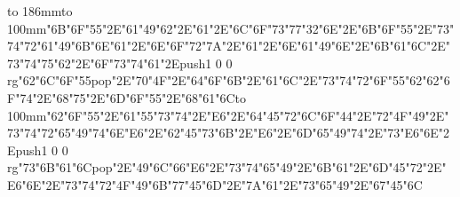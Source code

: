 \hbox to 186mm{\hsize=81mm\vbox to 100mm{\vfill\ipa\char"6B\ipa\char"6F\ipa\char"55\ipa\char"2E\ipa\char"61\ipa\char"49\ipa\char"62\ipa\char"2E\ipa\char"61\ipa\char"2E\ipa\char"6C\ipa\char"6F\ipa\char"73\medskip\ipa\char"77\ipa\char"32\ipa\char"6E\ipa\char"2E\ipa\char"6B\ipa\char"6F\ipa\char"55\ipa\char"2E\ipa\char"73\ipa\char"74\ipa\char"72\ipa\char"61\ipa\char"49\ipa\char"6B\medskip\ipa\char"6E\ipa\char"61\ipa\char"2E\ipa\char"6E\ipa\char"6F\ipa\char"72\ipa\char"7A\ipa\char"2E\ipa\char"61\ipa\char"2E\ipa\char"6E\ipa\char"61\ipa\char"49\ipa\char"6E\ipa\char"2E\ipa\char"6B\ipa\char"61\ipa\char"6C\ipa\char"2E\ipa\char"73\ipa\char"74\ipa\char"75\ipa\char"62\ipa\char"2E\ipa\char"6F\ipa\char"73\ipa\char"74\medskip\ipa\char"61\ipa\char"2E\pdfcolorstack\match push{1 0 0 rg}\ipa\char"62\ipa\char"6C\ipa\char"6F\ipa\char"55\pdfcolorstack\match pop{}\ipa\char"2E\ipa\char"70\ipa\char"4F\ipa\char"2E\ipa\char"64\ipa\char"6F\ipa\char"6B\ipa\char"2E\ipa\char"61\ipa\char"6C\ipa\char"2E\ipa\char"73\ipa\char"74\ipa\char"72\ipa\char"6F\ipa\char"55\ipa\char"62\medskip\ipa\char"62\ipa\char"6F\ipa\char"74\ipa\char"2E\ipa\char"68\ipa\char"75\ipa\char"2E\ipa\char"6D\ipa\char"6F\ipa\char"55\ipa\char"2E\ipa\char"68\ipa\char"61\ipa\char"6C\vfill}\hfill\vbox to 100mm{\vfill\ipa\char"62\ipa\char"6F\ipa\char"55\ipa\char"2E\ipa\char"61\ipa\char"55\ipa\char"73\ipa\char"74\ipa\char"2E\ipa\char"E6\ipa\char"2E\ipa\char"64\ipa\char"45\ipa\char"72\medskip\ipa\char"6C\ipa\char"6F\ipa\char"44\ipa\char"2E\ipa\char"72\ipa\char"4F\ipa\char"49\ipa\char"2E\ipa\char"73\ipa\char"74\ipa\char"72\ipa\char"65\ipa\char"49\ipa\char"74\medskip\ipa\char"6E\ipa\char"E6\ipa\char"2E\ipa\char"62\ipa\char"45\ipa\char"73\ipa\char"6B\ipa\char"2E\ipa\char"E6\ipa\char"2E\ipa\char"6D\ipa\char"65\ipa\char"49\ipa\char"74\ipa\char"2E\ipa\char"73\ipa\char"E6\ipa\char"6E\ipa\char"2E\pdfcolorstack\match push{1 0 0 rg}\ipa\char"73\ipa\char"6B\ipa\char"61\ipa\char"6C\pdfcolorstack\match pop{}\ipa\char"2E\ipa\char"49\ipa\char"6C\ipa\char"66\medskip\ipa\char"E6\ipa\char"2E\ipa\char"73\ipa\char"74\ipa\char"65\ipa\char"49\ipa\char"2E\ipa\char"6B\ipa\char"61\ipa\char"2E\ipa\char"6D\ipa\char"45\ipa\char"72\ipa\char"2E\ipa\char"E6\ipa\char"6E\ipa\char"2E\ipa\char"73\ipa\char"74\ipa\char"72\ipa\char"4F\ipa\char"49\ipa\char"6B\medskip\ipa\char"77\ipa\char"45\ipa\char"6D\ipa\char"2E\ipa\char"7A\ipa\char"61\ipa\char"2E\ipa\char"73\ipa\char"65\ipa\char"49\ipa\char"2E\ipa\char"67\ipa\char"45\ipa\char"6C\vfill}}\eject
